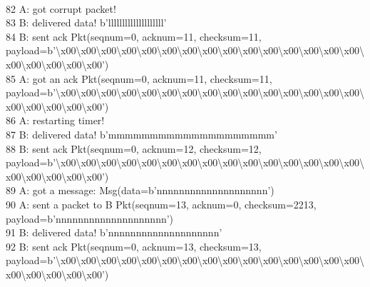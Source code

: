 \documentclass{article}
\begin{document}
{ \\
82 A: got corrupt packet! \\
83 B: delivered data! b'llllllllllllllllllll' \\
84 B: sent ack Pkt(seqnum=0, acknum=11, checksum=11,
payload=b'\textbackslash{}x00\textbackslash{}x00\textbackslash{}x00\textbackslash{}x00\textbackslash{}x00\textbackslash{}x00\textbackslash{}x00\textbackslash{}x00\textbackslash{}x00\textbackslash{}x00\textbackslash{}x00\textbackslash{}x00\textbackslash{}x00\textbackslash{}x00\textbackslash{}x00\textbackslash{}x00\textbackslash{}x00\textbackslash{}x00\textbackslash{}x00\textbackslash{}x00')
\\
85 A: got an ack Pkt(seqnum=0, acknum=11, checksum=11,
payload=b'\textbackslash{}x00\textbackslash{}x00\textbackslash{}x00\textbackslash{}x00\textbackslash{}x00\textbackslash{}x00\textbackslash{}x00\textbackslash{}x00\textbackslash{}x00\textbackslash{}x00\textbackslash{}x00\textbackslash{}x00\textbackslash{}x00\textbackslash{}x00\textbackslash{}x00\textbackslash{}x00\textbackslash{}x00\textbackslash{}x00\textbackslash{}x00\textbackslash{}x00')
\\
86 A: restarting timer! \\
87 B: delivered data! b'mmmmmmmmmmmmmmmmmmmm' \\
88 B: sent ack Pkt(seqnum=0, acknum=12, checksum=12,
payload=b'\textbackslash{}x00\textbackslash{}x00\textbackslash{}x00\textbackslash{}x00\textbackslash{}x00\textbackslash{}x00\textbackslash{}x00\textbackslash{}x00\textbackslash{}x00\textbackslash{}x00\textbackslash{}x00\textbackslash{}x00\textbackslash{}x00\textbackslash{}x00\textbackslash{}x00\textbackslash{}x00\textbackslash{}x00\textbackslash{}x00\textbackslash{}x00\textbackslash{}x00')
\\
89 A: got a message: Msg(data=b'nnnnnnnnnnnnnnnnnnnn') \\
90 A: sent a packet to B Pkt(seqnum=13, acknum=0, checksum=2213,
payload=b'nnnnnnnnnnnnnnnnnnnn') \\
91 B: delivered data! b'nnnnnnnnnnnnnnnnnnnn' \\
92 B: sent ack Pkt(seqnum=0, acknum=13, checksum=13,
payload=b'\textbackslash{}x00\textbackslash{}x00\textbackslash{}x00\textbackslash{}x00\textbackslash{}x00\textbackslash{}x00\textbackslash{}x00\textbackslash{}x00\textbackslash{}x00\textbackslash{}x00\textbackslash{}x00\textbackslash{}x00\textbackslash{}x00\textbackslash{}x00\textbackslash{}x00\textbackslash{}x00\textbackslash{}x00\textbackslash{}x00\textbackslash{}x00\textbackslash{}x00')
}
\end{document}
